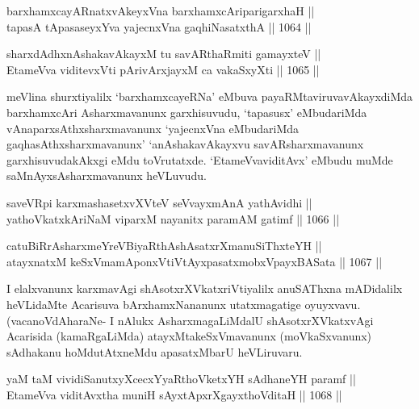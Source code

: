 
\begin{shl}
barxhamxcayARnatxvAkeyxVna barxhamxcAriparigarxhaH || \\
tapasA tApasaseyxYva yajecnxVna gaqhiNasatxthA \hfill || 1064 ||  
\end{shl}
				
\begin{shl}
sharxdAdhxnAshakavAkayxM tu savARthaRmiti gamayxteV ||  \\
EtameVva viditevxVti pArivArxjayxM ca vakaSxyXti \hfill || 1065 ||  
\end{shl}

\begin{artha}
meVlina shurxtiyalilx `barxhamxcayeRNa' eMbuva payaRMtaviruvavAkayxdiMda barxhamxcAri Asharxmavanunx garxhisuvudu, `tapasusx' eMbudariMda vAnaparxsAthxsharxmavanunx `yajecnxVna eMbudariMda gaqhasAthxsharxmavanunx' `anAshakavAkayxvu savARsharxmavanunx garxhisuvudakAkxgi eMdu toVrutatxde. `EtameVvaviditAvx' eMbudu muMde saMnAyxsAsharxmavanunx heVLuvudu.
\end{artha}


\begin{shl}
saveVR\s pi karxmashasetxvXVteV seVvayxmAnA yathAvidhi || \\
yathoVkatxkAriNaM viparxM nayanitx paramAM gatimf \hfill || 1066 ||  
\end{shl}
				
\begin{shl}
catuBiRrAsharxmeYreVBiyaRthAshAsatxrXmanuSiThxteYH || \\
atayxnatxM keSxVmamAponxVtiVtAyxpasatxmobxV\s payxBASata \hfill || 1067 ||  
\end{shl}

\begin{artha}
I elalxvanunx karxmavAgi shAsotxrXVkatxriVtiyalilx anuSAThxna mADidalilx heVLidaMte Acarisuva bArxhamxNananunx utatxmagatige oyuyxvavu. (vacanoVdAharaNe- I nAlukx AsharxmagaLiMdalU shAsotxrXVkatxvAgi Acarisida (kamaRgaLiMda) atayxMtakeSxVmavanunx (moVkaSxvanunx) sAdhakanu hoMdutAtxneMdu apasatxMbarU heVLiruvaru.
\end{artha}


\begin{shl}
yaM taM vividiSanutxyXcecxYyaRthoVketxYH sAdhaneYH paramf || \\
EtameVva viditAvx\s tha muniH sAyxtApxrXgayxthoVditaH \hfill || 1068 || 
\end{shl}

